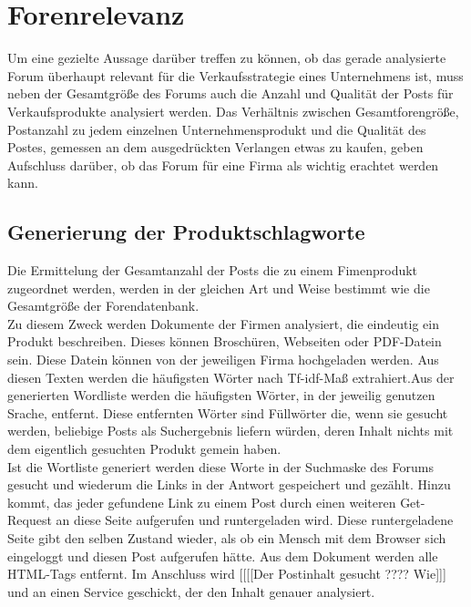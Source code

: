 \section{Forenrelevanz}
Um eine gezielte Aussage darüber treffen zu können, ob das gerade analysierte Forum überhaupt relevant für die Verkaufsstrategie eines Unternehmens ist, muss neben der Gesamtgröße des Forums auch die Anzahl und Qualität der Posts für Verkaufsprodukte analysiert werden. Das Verhältnis zwischen Gesamtforengröße, Postanzahl zu jedem einzelnen Unternehmensprodukt und die Qualität des Postes, gemessen an dem ausgedrückten Verlangen etwas zu kaufen, geben Aufschluss darüber, ob das Forum für eine Firma als wichtig erachtet werden kann.
\subsection{Generierung der Produktschlagworte}
Die Ermittelung der Gesamtanzahl der Posts die zu einem Fimenprodukt zugeordnet werden, werden in der gleichen Art und Weise bestimmt wie die Gesamtgröße der Forendatenbank.\\
Zu diesem Zweck werden Dokumente der Firmen analysiert, die eindeutig ein Produkt beschreiben. Dieses können Broschüren, Webseiten oder PDF-Datein sein. Diese Datein können von der jeweiligen Firma hochgeladen werden. Aus diesen Texten werden die häufigsten Wörter nach Tf-idf-Maß extrahiert.Aus der generierten Wordliste werden die häufigsten Wörter, in der jeweilig genutzen Srache, entfernt. Diese entfernten Wörter sind Füllwörter die, wenn sie gesucht werden, beliebige Posts als Suchergebnis liefern würden, deren Inhalt nichts mit dem eigentlich gesuchten Produkt gemein haben.\\
Ist die Wortliste generiert werden diese Worte in der Suchmaske des Forums gesucht und wiederum die Links in der Antwort gespeichert und gezählt. Hinzu kommt, das jeder gefundene Link zu einem Post durch einen weiteren Get-Request an diese Seite aufgerufen und runtergeladen wird. Diese runtergeladene Seite gibt den selben Zustand wieder, als ob ein Mensch mit dem Browser sich eingeloggt und diesen Post aufgerufen hätte. Aus dem Dokument werden alle HTML-Tags entfernt. Im Anschluss wird [[[[Der Postinhalt gesucht ???? Wie]]] und an einen Service geschickt, der den Inhalt genauer analysiert. 
